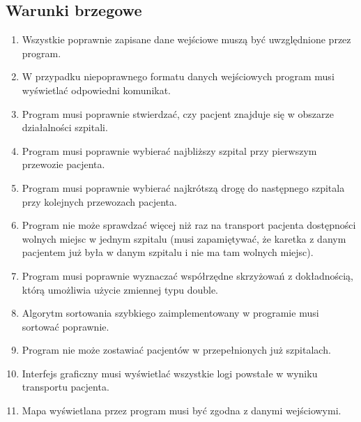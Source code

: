 \documentclass{article}
\begin{document}
\subsection{Warunki brzegowe}
\begin{enumerate}
    \item Wszystkie poprawnie zapisane dane wejściowe muszą być uwzględnione przez program.
    \item W przypadku niepoprawnego formatu danych wejściowych program musi wyświetlać odpowiedni komunikat.
    \item Program musi poprawnie stwierdzać, czy pacjent znajduje się w obszarze działalności szpitali.
    \item Program musi poprawnie wybierać najbliższy szpital przy pierwszym przewozie pacjenta.
    \item Program musi poprawnie wybierać najkrótszą drogę do następnego szpitala przy kolejnych przewozach pacjenta.
    \item Program nie może sprawdzać więcej niż raz na transport pacjenta dostępności wolnych miejsc w jednym szpitalu (musi zapamiętywać, że karetka z danym pacjentem już była w danym szpitalu i nie ma tam wolnych miejsc).
    \item Program musi poprawnie wyznaczać współrzędne skrzyżowań z dokładnością, którą umożliwia użycie zmiennej typu double.
    \item Algorytm sortowania szybkiego zaimplementowany w programie musi sortować poprawnie.
    \item Program nie może zostawiać pacjentów w przepełnionych już szpitalach.
    \item Interfejs graficzny musi wyświetlać wszystkie logi powstałe w wyniku transportu pacjenta.
    \item Mapa wyświetlana przez program musi być zgodna z danymi wejściowymi.
\end{enumerate}
\end{document}
